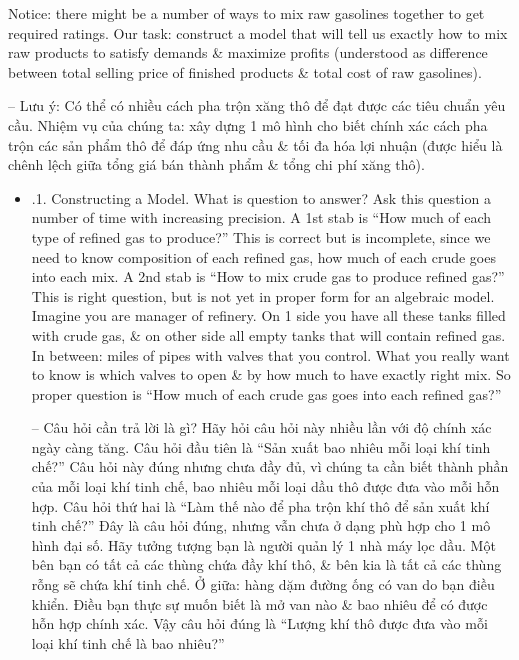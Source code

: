 \documentclass{article}
\begin{document}
\begin{itemize}
\begin{itemize}
        Notice: there might be a number of ways to mix raw gasolines together to get required ratings. Our task: construct a model that will tell us exactly how to mix raw products to satisfy demands \& maximize profits (understood as difference between total selling price of finished products \& total cost of raw gasolines).

        -- Lưu ý: Có thể có nhiều cách pha trộn xăng thô để đạt được các tiêu chuẩn yêu cầu. Nhiệm vụ của chúng ta: xây dựng 1 mô hình cho biết chính xác cách pha trộn các sản phẩm thô để đáp ứng nhu cầu \& tối đa hóa lợi nhuận (được hiểu là chênh lệch giữa tổng giá bán thành phẩm \& tổng chi phí xăng thô).
        \begin{itemize}
            \item {.1. Constructing a Model.} What is question to answer? Ask this question a number of time with increasing precision. A 1st stab is ``How much of each type of refined gas to produce?'' This is correct but is incomplete, since we need to know composition of each refined gas, how much of each crude goes into each mix. A 2nd stab is ``How to mix crude gas to produce refined gas?'' This is right question, but is not yet in proper form for an algebraic model. Imagine you are manager of refinery. On 1 side you have all these tanks filled with crude gas, \& on other side all empty tanks that will contain refined gas. In between: miles of pipes with valves that you control. What you really want to know is which valves to open \& by how much to have exactly right mix. So proper question is ``How much of each crude gas goes into each refined gas?''

            -- Câu hỏi cần trả lời là gì? Hãy hỏi câu hỏi này nhiều lần với độ chính xác ngày càng tăng. Câu hỏi đầu tiên là ``Sản xuất bao nhiêu mỗi loại khí tinh chế?'' Câu hỏi này đúng nhưng chưa đầy đủ, vì chúng ta cần biết thành phần của mỗi loại khí tinh chế, bao nhiêu mỗi loại dầu thô được đưa vào mỗi hỗn hợp. Câu hỏi thứ hai là ``Làm thế nào để pha trộn khí thô để sản xuất khí tinh chế?'' Đây là câu hỏi đúng, nhưng vẫn chưa ở dạng phù hợp cho 1 mô hình đại số. Hãy tưởng tượng bạn là người quản lý 1 nhà máy lọc dầu. Một bên bạn có tất cả các thùng chứa đầy khí thô, \& bên kia là tất cả các thùng rỗng sẽ chứa khí tinh chế. Ở giữa: hàng dặm đường ống có van do bạn điều khiển. Điều bạn thực sự muốn biết là mở van nào \& bao nhiêu để có được hỗn hợp chính xác. Vậy câu hỏi đúng là ``Lượng khí thô được đưa vào mỗi loại khí tinh chế là bao nhiêu?''


\end{itemize}
\end{itemize}
\end{itemize}
\end{document}
